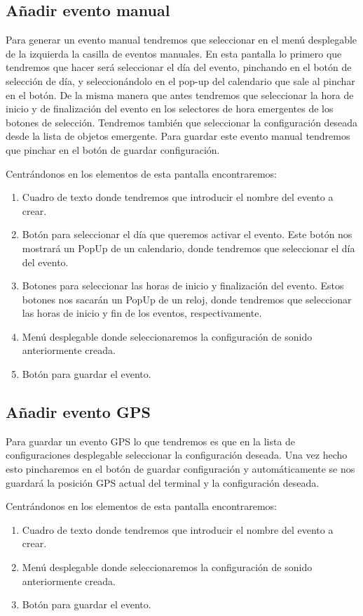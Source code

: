 \subsection{Añadir evento manual}

Para generar un evento manual tendremos que seleccionar en el menú desplegable de la izquierda la casilla de eventos manuales.
En esta pantalla lo primero que tendremos que hacer será seleccionar el día del evento, pinchando en el botón de selección de día, y seleccionándolo en el pop-up del calendario que sale al pinchar en el botón.
De la misma manera que antes tendremos que seleccionar la hora de inicio y de finalización del evento en los selectores de hora emergentes de los botones de selección.
Tendremos también que seleccionar la configuración deseada desde la lista de objetos emergente.
Para guardar este evento manual tendremos que pinchar en el botón de guardar configuración.

Centrándonos en los elementos de esta pantalla encontraremos:
\begin{enumerate}
\item Cuadro de texto donde tendremos que introducir el nombre del evento a crear.
\item Botón para seleccionar el día que queremos activar el evento. Este botón nos mostrará un PopUp de un calendario, donde tendremos que seleccionar el día del evento.
\item Botones para seleccionar las horas de inicio y finalización del evento. Estos botones nos sacarán un PopUp de un reloj, donde tendremos que seleccionar las horas de inicio y fin de los eventos, respectivamente.
\item Menú desplegable donde seleccionaremos la configuración de sonido anteriormente creada.
\item Botón para guardar el evento.
\end{enumerate}



\subsection{Añadir evento GPS}

Para guardar un evento GPS lo que tendremos es que en la lista de configuraciones desplegable seleccionar la configuración deseada.
Una vez hecho esto pincharemos en el botón de guardar configuración y automáticamente se nos guardará la posición GPS actual del terminal y la configuración deseada.

Centrándonos en los elementos de esta pantalla encontraremos:
\begin{enumerate}
\item Cuadro de texto donde tendremos que introducir el nombre del evento a crear.
\item Menú desplegable donde seleccionaremos la configuración de sonido anteriormente creada.
\item Botón para guardar el evento.
\end{enumerate}


